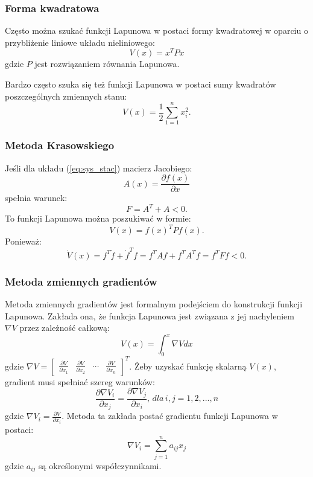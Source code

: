 \documentclass{article}
\begin{document}
        \subsubsection{Forma kwadratowa}
        Często można szukać funkcji Lapunowa w postaci formy kwadratowej w oparciu o przybliżenie liniowe układu nieliniowego:
        $$
            V(x) = x^{T}Px
        $$
        gdzie $P$ jest rozwiązaniem równania Lapunowa.
        
        Bardzo często szuka się też funkcji Lapunowa w postaci sumy kwadratów poszczególnych zmiennych stanu:
        $$
            V(x) = \frac{1}{2}\sum_{1=1}^{n}{x_{i}^{2}}.
        $$

        \subsubsection{Metoda Krasowskiego}
        Jeśli dla układu (\ref{eq:sys_stac}) macierz Jacobiego:
        $$
            A(x) = \frac{\partial f(x)}{\partial x}
        $$
        spełnia warunek:
        $$
            F = A^{T} + A < 0.
        $$
        To funkcji Lapunowa można poszukiwać w formie:
        $$
            V(x) = f(x)^{T}Pf(x).
        $$
        Ponieważ:
        $$
            \dot{V}(x) = f^{T}\dot{f} + \dot{f}^{T}f = f^{T}Af + f^{T}A^{T}f = f^{T}Ff < 0.
        $$

        \subsubsection{Metoda zmiennych gradientów}
        Metoda zmiennych gradientów jest formalnym podejściem do konstrukcji funkcji Lapunowa.
        Zakłada ona, że funkcja Lapunowa jest związana z jej nachyleniem $\nabla V$ przez zależność całkową:
        \begin{equation}
            \label{eq:mzg_0}
            V(x) = \int_{0}^{x}{\nabla Vdx}
        \end{equation}
        gdzie $\nabla V = \begin{bmatrix} \frac{\partial V}{\partial x_{1}} & \frac{\partial V}{\partial x_{2}} & \cdots & \frac{\partial V}{\partial x_{n}}  \end{bmatrix}^{T}$.
        Żeby uzyskać funkcję skalarną $V(x)$, gradient musi spełniać szereg warunków:
        \begin{equation}
            \label{eq:mzg_1}
            \frac{\partial \nabla V_{i}}{\partial x_{j}} = \frac{\partial \nabla V_{j}}{\partial x_{i}}, \, dla\,i,j=1, 2, ..., n
        \end{equation}
        gdzie $\nabla V_{i} = \frac{\partial V}{\partial x_{i}}$.
        Metoda ta zakłada postać gradientu funkcji Lapunowa w postaci:
        \begin{equation}
            \label{eq:mzg_2}
            \nabla V_{i} = \sum_{j=1}^{n}{a_{ij}x_{j}}
        \end{equation}
        gdzie $a_{ij}$ są określonymi współczynnikami.
\end{document}
